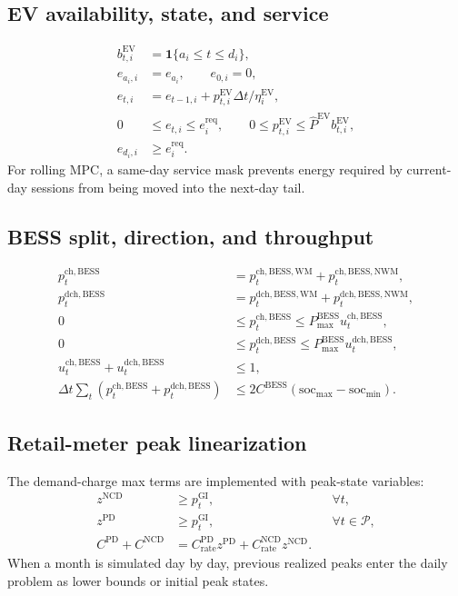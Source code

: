\documentclass[final,5p,times]{elsarticle}
\newcommand{\DeltaT}{\Delta t}
\newcommand{\EV}{\mathrm{EV}}
\newcommand{\BESS}{\mathrm{BESS}}
\newcommand{\GI}{\mathrm{GI}}
\newcommand{\PD}{\mathrm{PD}}
\newcommand{\NCD}{\mathrm{NCD}}
\newcommand{\soc}{\mathrm{soc}}
\newcommand{\WM}{\mathrm{WM}}
\newcommand{\NWM}{\mathrm{NWM}}
\newcommand{\ch}{\mathrm{ch}}
\newcommand{\dch}{\mathrm{dch}}
\newcommand{\req}{\mathrm{req}}
\newcommand{\calP}{\mathcal{P}}
\begin{document}
\subsection{EV availability, state, and service}
\begin{align}
b_{t,i}^{\EV} &= \mathbf{1}\{a_i\le t\le d_i\},\label{eq:app_ev_avail}\\
e_{a_i,i} &= e_{a_i},\qquad e_{0,i}=0,\label{eq:app_ev_boundary}\\
e_{t,i} &= e_{t-1,i}+p_{t,i}^{\EV}\DeltaT/\eta_i^{\EV},\label{eq:app_ev_state}\\
0&\le e_{t,i}\le e_i^{\req},\qquad 0\le p_{t,i}^{\EV}\le \hat P^{\EV}b_{t,i}^{\EV},\label{eq:app_ev_bounds}\\
e_{d_i,i}&\ge e_i^{\req}.\label{eq:app_ev_departure}
\end{align}
For rolling MPC, a same-day service mask prevents energy required by current-day sessions from being moved into the next-day tail.

\subsection{BESS split, direction, and throughput}
\begin{align}
p_t^{\ch,\BESS}&=p_t^{\ch,\BESS,\WM}+p_t^{\ch,\BESS,\NWM},\label{eq:app_bess_split_ch}\\
p_t^{\dch,\BESS}&=p_t^{\dch,\BESS,\WM}+p_t^{\dch,\BESS,\NWM},\label{eq:app_bess_split_dch}\\
0&\le p_t^{\ch,\BESS}\le P_{\max}^{\BESS}u_t^{\ch,\BESS},\label{eq:app_bess_binary_ch}\\
0&\le p_t^{\dch,\BESS}\le P_{\max}^{\BESS}u_t^{\dch,\BESS},\label{eq:app_bess_binary_dch}\\
u_t^{\ch,\BESS}+u_t^{\dch,\BESS}&\le 1,\label{eq:app_bess_binary_sum}\\
\DeltaT\sum_t\left(p_t^{\ch,\BESS}+p_t^{\dch,\BESS}\right)&\le 2C^{\BESS}(\soc_{\max}-\soc_{\min}).\label{eq:app_bess_throughput}
\end{align}

\subsection{Retail-meter peak linearization}
The demand-charge max terms are implemented with peak-state variables:
\begin{align}
z^{\NCD} &\ge p_t^{\GI}, && \forall t,\label{eq:app_ncd_peak}\\
z^{\PD} &\ge p_t^{\GI}, && \forall t\in\calP,\label{eq:app_pd_peak}\\
C^{\PD}+C^{\NCD} &= C^{\PD}_{\mathrm{rate}}z^{\PD}+C^{\NCD}_{\mathrm{rate}}z^{\NCD}.\label{eq:app_peak_cost}
\end{align}
When a month is simulated day by day, previous realized peaks enter the daily problem as lower bounds or initial peak states.
\end{document}
